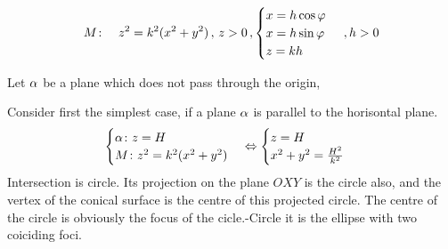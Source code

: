 \documentclass[12pt]{article}
\numberwithin{equation}{section}
\begin{document}
\begin{equation}\label{conicalsurfaceM}
      M\colon\quad               
z^2=k^2(x^2+y^2)\,,\, z>0\,,
 \begin{cases}
   x=h\cos\varphi\cr
   x=h\sin\varphi\cr
   z=kh\cr
\end{cases}\,,h>0
\end{equation}

  Let $\alpha$ be a plane which does not pass through the origin,

  	 Consider first the simplest case, if
 a plane $\alpha$ is parallel to the horisontal plane.
            \begin{equation*}
  \begin{cases}
 \alpha\colon z=H\cr
 M\colon z^2=k^2(x^2+y^2) 
    \end{cases}
   \Leftrightarrow 
   \begin{cases}
            z=H\cr
 x^2+y^2={H^2\over k^2} 
    \end{cases}
  \end{equation*}
Intersection is circle. Its projection on the plane $OXY$
is the circle also, and the vertex of
the conical surface is the centre of this projected
circle.  The centre of the  circle is obviously the focus
of the cicle.-Circle it is the ellipse with 
two coiciding foci.
\end{document}
